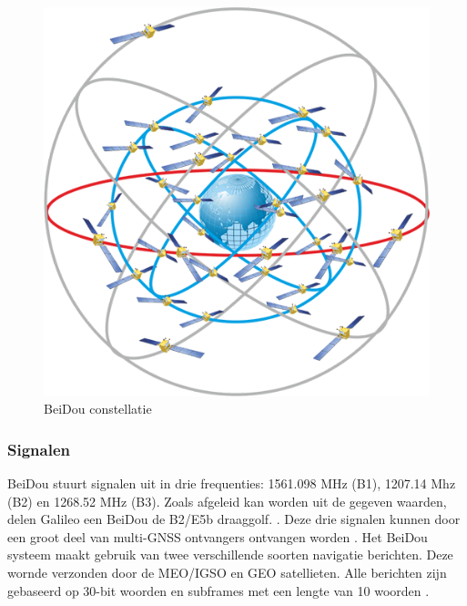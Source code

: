 \begin{figure}[hpb]
	\includegraphics[scale=0.5]{BeiDou.png}
	\caption{BeiDou constellatie \cite{LImgBeiDou}}
	\label{imgBeiDou}
\end{figure} 

\subsubsection{Signalen}
BeiDou stuurt signalen uit in drie frequenties: 1561.098 MHz (B1), 1207.14 Mhz (B2) en 1268.52 MHz (B3). Zoals afgeleid kan worden uit de gegeven waarden, delen Galileo een BeiDou de B2/E5b draaggolf. \cite{LBibPPP2,LBibBeiDou4}. Deze drie signalen kunnen door een groot deel van multi-GNSS ontvangers ontvangen worden \cite{LBibGNSS9}. Het BeiDou systeem maakt gebruik van twee verschillende soorten navigatie berichten. Deze wornde verzonden door de MEO/IGSO en GEO satellieten. Alle berichten zijn gebaseerd op 30-bit woorden en subframes met een lengte van 10 woorden \cite{LBibBeiDou5}.  

